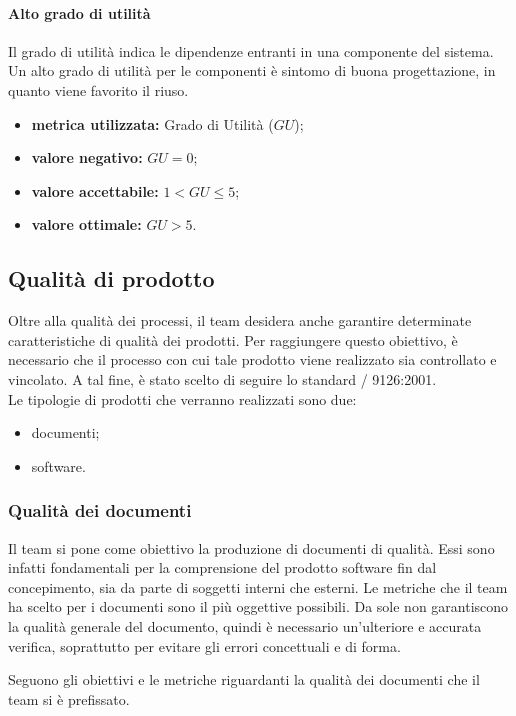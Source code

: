 			\paragraph{Alto grado di utilità}
				\label{OAGDU}
				Il grado di utilità indica le dipendenze entranti in una componente del sistema. Un alto grado di utilità per le componenti è sintomo di buona progettazione, in quanto viene favorito il riuso.
				\begin{itemize}
					\item \textbf{metrica utilizzata:} Grado di Utilità ($GU$);
					\item \textbf{valore negativo:} $GU=0$;
					\item \textbf{valore accettabile:} $1<GU\leq5$;
					\item \textbf{valore ottimale:} $GU>5$.
				\end{itemize}
				
	\subsection{Qualità di prodotto}
		Oltre alla qualità dei processi, il team desidera anche garantire determinate caratteristiche di qualità dei prodotti. Per raggiungere questo obiettivo, è necessario che il processo con cui tale prodotto viene realizzato sia controllato e vincolato. A tal fine, è stato scelto di seguire lo standard / 9126:2001.\\
		Le tipologie di prodotti che verranno realizzati sono due:
		\begin{itemize}
			\item documenti;
			\item software.
		\end{itemize}
	
	\subsubsection{Qualità dei documenti}
		Il team si pone come obiettivo la produzione di documenti di qualità. Essi sono infatti fondamentali per la comprensione del prodotto software fin dal concepimento, sia da parte di soggetti interni che esterni. Le metriche che il team ha scelto per i documenti sono il più oggettive possibili. Da sole non garantiscono la qualità generale del documento, quindi è necessario un'ulteriore e accurata verifica, soprattutto per evitare gli errori concettuali e di forma.
		
		
		Seguono gli obiettivi e le metriche riguardanti la qualità dei documenti che il team si è prefissato.

